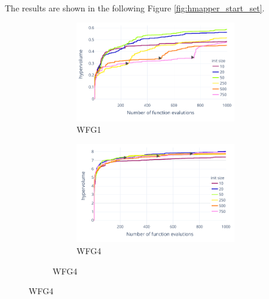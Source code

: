     The results are shown in the following Figure \ref{fig:hmapper_start_set}. 
    
    \begin{figure}[!h]
        \centering
        \begin{subfigure}{\textwidth}
            \begin{subfigure}{0.45\textwidth}
                \includegraphics[width=\textwidth]{content/images/hypermapper_wfg1_start_set}
                \caption{WFG1}
                \label{fig:hmapper_wfg1_start_set}
            \end{subfigure}
            \begin{subfigure}{0.45\textwidth}
                \includegraphics[width=\textwidth]{content/images/hypermapper_wfg4_start_set}
                \caption{WFG4}
                \label{fig:hmapper_wfg4_start_set}
            \end{subfigure}
        \end{subfigure} 
        \hfill


\end{figure}
